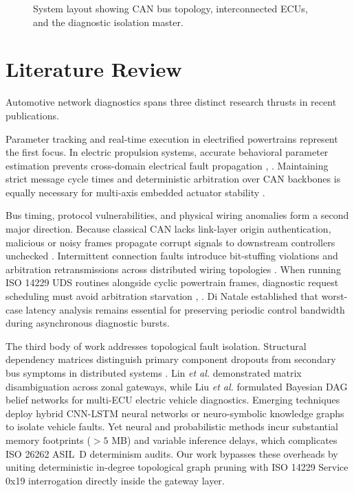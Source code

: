 \documentclass[conference]{IEEEtran}
\begin{document}
\begin{figure}[t]
\caption{System layout showing CAN bus topology, interconnected ECUs, and the diagnostic isolation master.}
\label{fig:system_arch}
\end{figure}

\section{Literature Review}
Automotive network diagnostics spans three distinct research thrusts in recent publications.

Parameter tracking and real-time execution in electrified powertrains represent the first focus. In electric propulsion systems, accurate behavioral parameter estimation prevents cross-domain electrical fault propagation \cite{saravanan2025starter}, \cite{saravanan2025parameter}. Maintaining strict message cycle times and deterministic arbitration over CAN backbones is equally necessary for multi-axis embedded actuator stability \cite{krishnan2021can}. 

Bus timing, protocol vulnerabilities, and physical wiring anomalies form a second major direction. Because classical CAN lacks link-layer origin authentication, malicious or noisy frames propagate corrupt signals to downstream controllers unchecked \cite{nair2025qml}. Intermittent connection faults introduce bit-stuffing violations and arbitration retransmissions across distributed wiring topologies \cite{wang2023can}. When running ISO 14229 UDS routines alongside cyclic powertrain frames, diagnostic request scheduling must avoid arbitration starvation \cite{schmidt2022uds}, \cite{nolte2022wcrt}. Di Natale \cite{dinatale2022can} established that worst-case latency analysis remains essential for preserving periodic control bandwidth during asynchronous diagnostic bursts.

The third body of work addresses topological fault isolation. Structural dependency matrices distinguish primary component dropouts from secondary bus symptoms in distributed systems \cite{zhang2022graph}. Lin \emph{et al.} \cite{lin2023zonal} demonstrated matrix disambiguation across zonal gateways, while Liu \emph{et al.} \cite{liu2023dag} formulated Bayesian DAG belief networks for multi-ECU electric vehicle diagnostics. Emerging techniques deploy hybrid CNN-LSTM neural networks \cite{lu2025deep} or neuro-symbolic knowledge graphs \cite{bohne2023neuro} to isolate vehicle faults. Yet neural and probabilistic methods incur substantial memory footprints ($>5$ MB) and variable inference delays, which complicates ISO 26262 ASIL~D determinism audits. Our work bypasses these overheads by uniting deterministic in-degree topological graph pruning with ISO 14229 Service 0x19 interrogation directly inside the gateway layer.
\end{document}
